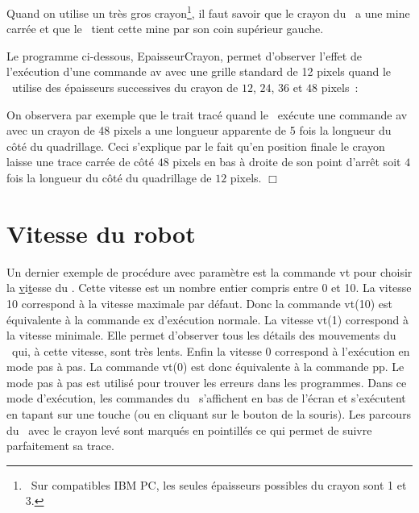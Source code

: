 Quand on utilise un très gros crayon\@\footnote{\ Sur
compatibles IBM PC,  les seules épaisseurs possibles du crayon sont 1 et 3.}, il faut savoir que le crayon du \robot\ 
a une mine carrée et que le \robot\ tient cette mine par son coin supérieur  gauche.

\begin{exemple}[Crayon à grosse mine]{\rm
Le programme ci-dessous, {\idt EpaisseurCrayon}, permet d'observer
 l'effet de l'exécution d'une commande {\idt av} avec une grille
 standard de 12 pixels quand le \robot\ utilise des épaisseurs
 successives du crayon de $12$, $24$, $36$ et $48$
 pixels~:\hfill\\[6cm]
%
\vspace*{-6cm}%

On observera par exemple que le trait tracé quand le \robot\ exécute
une commande {\idt av} avec un crayon de 48 pixels a une longueur
apparente de 5 fois la longueur du côté du quadrillage.  Ceci
s'explique par le fait qu'en position finale le crayon laisse une
trace carrée de côté $48$ pixels en bas à droite de son point d'arrêt
soit $4$ fois la longueur du côté du quadrillage de $12$ pixels. 
$\Box$ }%
\end{exemple}

\section{Vitesse du robot}

Un dernier exemple de procédure avec paramètre est la commande {\idt vt} pour choisir
la \underline{v}i\underline{t}esse du \robot. Cette vitesse est un nombre entier compris entre
0 et 10. La vitesse 10 correspond à la vitesse maximale par défaut. Donc la commande {\idt vt(10)}
est équivalente à la commande {\idt ex} d'exécution normale. La vitesse
{\idt vt(1)} correspond à la vitesse minimale. Elle permet d'observer tous les détails des
mouvements du \robot\ qui, à cette vitesse, sont très lents. Enfin la vitesse  0
correspond à l'exécution en mode pas à pas. La commande {\idt vt(0)} est donc équivalente
à la commande {\idt pp}. Le mode pas à pas est utilisé pour trouver les erreurs dans les
programmes. Dans ce mode d'exécution, les commandes du \robot\ s'affichent en bas de l'écran
et s'exécutent en tapant sur une touche (ou en cliquant sur le bouton de la souris). Les parcours
du \robot\ avec le crayon levé sont marqués en pointillés ce qui permet de suivre 
parfaitement sa trace.

